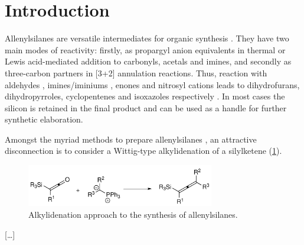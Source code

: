 \documentclass[]{beilstein}
\begin{document}
\section{Introduction}
Allenylsilanes are versatile intermediates for organic synthesis \cite{Pornet2002,Masse1995}. They have two main modes of reactivity: firstly, as propargyl anion equivalents in thermal \cite{Jian1995,Weinreb1998} or Lewis acid-mediated \cite{Danheiser1980,Danheiser1986} addition to carbonyls, acetals and imines, and secondly as three-carbon partners in [3+2] annulation reactions. Thus, reaction with aldehydes \cite{Danheiser1985}, imines/iminiums \cite{Danheiser1985,Daidouji2005}, enones \cite{Danheiser1981,Danheiser1983,Danheiser1985b} and nitrosyl cations \cite{Danheiser1987} leads to dihydrofurans, dihydropyrroles, cyclopentenes and isoxazoles respectively \cite{Yadav2004}. In most cases the silicon is retained in the final product and can be used as a handle for further synthetic elaboration.

Amongst the myriad methods to prepare allenylsilanes \cite{Pornet2002,Danheiser1987b}, an attractive disconnection is to consider a Wittig-type alkylidenation of a silylketene (\cref{fig:AlkylidenationApproach}).
\begin{figure}
\caption{Alkylidenation approach to the synthesis of allenylsilanes.}
\label{fig:AlkylidenationApproach}
\includegraphics[width=8.2cm,keepaspectratio]{figure1}
\end{figure}

[\ldots]
\end{document}
